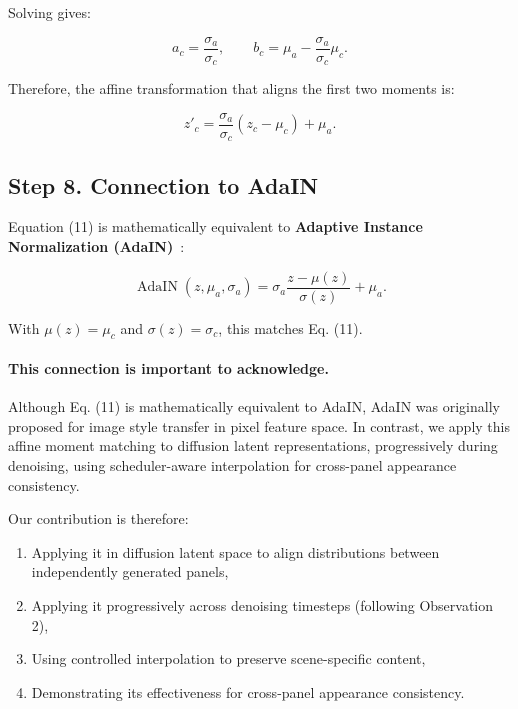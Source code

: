 \documentclass[12pt]{article}
\DeclareMathOperator{\AdaIN}{AdaIN}
\begin{document}
Solving gives:

\begin{equation}
a_c = \frac{\sigma_a}{\sigma_c}, \qquad b_c = \mu_a - \frac{\sigma_a}{\sigma_c} \mu_c.
\end{equation}

Therefore, the affine transformation that aligns the first two moments is:

\begin{equation}
\boxed{z'_c = \frac{\sigma_a}{\sigma_c} (z_c - \mu_c) + \mu_a}.
\end{equation}

\subsection{Step 8. Connection to AdaIN}

Equation (11) is mathematically equivalent to \textbf{Adaptive Instance Normalization (AdaIN)}~\cite{HuangICCV2017}:

\begin{equation}
\AdaIN(z, \mu_a, \sigma_a) = \sigma_a \frac{z - \mu(z)}{\sigma(z)} + \mu_a.
\end{equation}

With $\mu(z) = \mu_c$ and $\sigma(z) = \sigma_c$, this matches Eq. (11).

\paragraph{This connection is important to acknowledge.}
Although Eq. (11) is mathematically equivalent to AdaIN, AdaIN was originally proposed for image style transfer in pixel feature space. In contrast, we apply this affine moment matching to diffusion latent representations, progressively during denoising, using scheduler-aware interpolation for cross-panel appearance consistency.

Our contribution is therefore:

\begin{enumerate}
\item Applying it in diffusion latent space to align distributions between independently generated panels,
\item Applying it progressively across denoising timesteps (following Observation 2),
\item Using controlled interpolation to preserve scene-specific content,
\item Demonstrating its effectiveness for cross-panel appearance consistency.
\end{enumerate}
\end{document}
